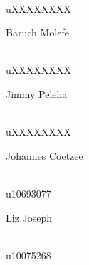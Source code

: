 \documentclass[a4paper,12pt]{report}
\begin{document}
\begin{titlepage}
\begin{center}
\begin{minipage}{0.4\textwidth}
\end{minipage}
\begin{minipage}{0.4\textwidth}
\begin{flushright} \large
\emph{} \\
uXXXXXXXX
\end{flushright}
\end{minipage}
\begin{minipage}{0.4\textwidth}
\begin{flushleft} \large
Baruch {Molefe}
\end{flushleft}
\end{minipage}
\begin{minipage}{0.4\textwidth}
\begin{flushright} \large
\emph{} \\
uXXXXXXXX
\end{flushright}
\end{minipage}
\begin{minipage}{0.4\textwidth}
\begin{flushleft} \large
Jimmy {Peleha}
\end{flushleft}
\end{minipage}
\begin{minipage}{0.4\textwidth}
\begin{flushright} \large
\emph{} \\
uXXXXXXXX
\end{flushright}
\end{minipage}
\begin{minipage}{0.4\textwidth}
\begin{flushleft} \large
Johannes {Coetzee}
\end{flushleft}
\end{minipage}
\begin{minipage}{0.4\textwidth}
\begin{flushright} \large
\emph{} \\
u10693077
\end{flushright}
\end{minipage}
\begin{minipage}{0.4\textwidth}
\begin{flushleft} \large
Liz {Joseph}
\end{flushleft}
\end{minipage}
\begin{minipage}{0.4\textwidth}
\begin{flushright} \large
\emph{} \\
u10075268
\end{flushright}

\end{minipage}
\end{center}
\end{titlepage}
\end{document}
